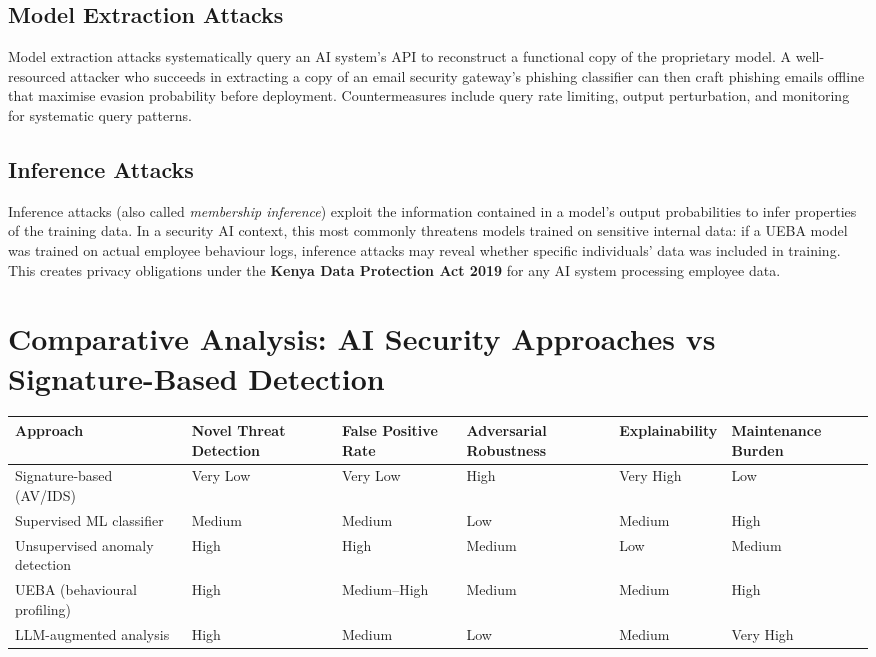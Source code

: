 \documentclass[12pt,a4paper]{article}
\begin{document}
\subsection{Model Extraction Attacks}
Model extraction attacks systematically query an AI system's API to reconstruct a functional copy of the proprietary model. A well-resourced attacker who succeeds in extracting a copy of an email security gateway's phishing classifier can then craft phishing emails offline that maximise evasion probability before deployment. Countermeasures include query rate limiting, output perturbation, and monitoring for systematic query patterns.

\subsection{Inference Attacks}
Inference attacks (also called \emph{membership inference}) exploit the information contained in a model's output probabilities to infer properties of the training data. In a security AI context, this most commonly threatens models trained on sensitive internal data: if a UEBA model was trained on actual employee behaviour logs, inference attacks may reveal whether specific individuals' data was included in training. This creates privacy obligations under the \textbf{Kenya Data Protection Act 2019} for any AI system processing employee data.

\section{Comparative Analysis: AI Security Approaches vs Signature-Based Detection}

\begin{center}
\renewcommand{\arraystretch}{1.5}
\begin{tabular}{|p{2.8cm}|p{2cm}|p{2cm}|p{2cm}|p{2cm}|p{2.2cm}|}
\hline
\textbf{Approach} & \textbf{Novel Threat Detection} & \textbf{False Positive Rate} & \textbf{Adversarial Robustness} & \textbf{Explainability} & \textbf{Maintenance Burden} \\
\hline
Signature-based (AV/IDS) & Very Low & Very Low & High & Very High & Low \\
\hline
Supervised ML classifier & Medium & Medium & Low & Medium & High \\
\hline
Unsupervised anomaly detection & High & High & Medium & Low & Medium \\
\hline
UEBA (behavioural profiling) & High & Medium--High & Medium & Medium & High \\
\hline
LLM-augmented analysis & High & Medium & Low & Medium & Very High \\
\hline
\end{tabular}
\end{center}
\end{document}
